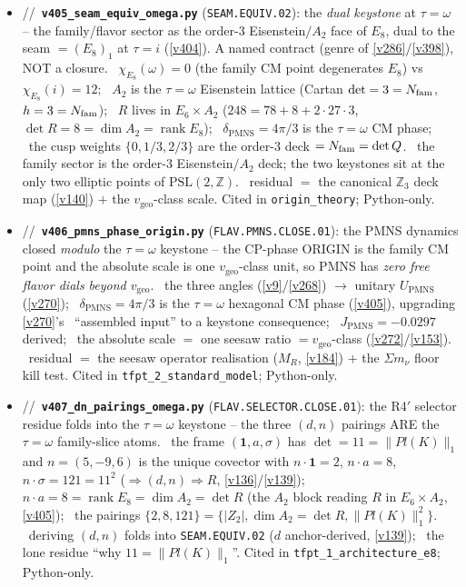\begin{itemize}
\item \mE/\mC/\mO\ \textbf{\texttt{v405\_seam\_equiv\_omega.py}} (\texttt{SEAM.EQUIV.02}): the \emph{dual keystone} at $\tau{=}\omega$ -- the family/flavor sector as the order-$3$ Eisenstein$/A_2$ face of $E_8$, dual to the seam $=(E_8)_1$ at $\tau{=}i$ (\vref{v404}). A named contract (genre of \vref{v286}/\vref{v398}), NOT a closure. \mE\ $\chi_{E_8}(\omega)=0$ (the family CM point degenerates $E_8$) vs $\chi_{E_8}(i)=12$; \mE\ $A_2$ is the $\tau{=}\omega$ Eisenstein lattice (Cartan $\det=3=N_{\mathrm{fam}}$, $h=3=N_{\mathrm{fam}}$); \mE\ $R$ lives in $E_6{\times}A_2$ ($248=78+8+2{\cdot}27{\cdot}3$, $\det R=8=\dim A_2=\operatorname{rank}E_8$); \mE\ $\delta_{\mathrm{PMNS}}=4\pi/3$ is the $\tau{=}\omega$ CM phase; \mE\ the cusp weights $\{0,1/3,2/3\}$ are the order-$3$ deck $=N_{\mathrm{fam}}=\det Q$. \mC\ the family sector is the order-$3$ Eisenstein$/A_2$ deck; the two keystones sit at the only two elliptic points of $\mathrm{PSL}(2,\mathbb Z)$. \mO\ residual $=$ the canonical $\mathbb Z_3$ deck map (\vref{v140}) $+$ the $v_{\mathrm{geo}}$-class scale. Cited in \texttt{origin\_theory}; Python-only.
\item \mE/\mC/\mO\ \textbf{\texttt{v406\_pmns\_phase\_origin.py}} (\texttt{FLAV.PMNS.CLOSE.01}): the PMNS dynamics closed \emph{modulo} the $\tau{=}\omega$ keystone -- the CP-phase ORIGIN is the family CM point and the absolute scale is one $v_{\mathrm{geo}}$-class unit, so PMNS has \emph{zero free flavor dials beyond $v_{\mathrm{geo}}$}. \mE\ the three angles (\vref{v9}/\vref{v268}) $\to$ unitary $U_{\mathrm{PMNS}}$ (\vref{v270}); \mC\ $\delta_{\mathrm{PMNS}}=4\pi/3$ is the $\tau{=}\omega$ hexagonal CM phase (\vref{v405}), upgrading \vref{v270}'s \mO\ ``assembled input'' to a keystone consequence; \mC\ $J_{\mathrm{PMNS}}=-0.0297$ derived; \mE\ the absolute scale $=$ one seesaw ratio $=v_{\mathrm{geo}}$-class (\vref{v272}/\vref{v153}). \mO\ residual $=$ the seesaw operator realisation ($M_R$, \vref{v184}) $+$ the $\Sigma m_\nu$ floor kill test. Cited in \texttt{tfpt\_2\_standard\_model}; Python-only.
\item \mE/\mC/\mO\ \textbf{\texttt{v407\_dn\_pairings\_omega.py}} (\texttt{FLAV.SELECTOR.CLOSE.01}): the R4$'$ selector residue folds into the $\tau{=}\omega$ keystone -- the three $(d,n)$ pairings ARE the $\tau{=}\omega$ family-slice atoms. \mE\ the frame $(\mathbf 1,a,\sigma)$ has $\det=11=\|Pl(K)\|_1$ and $n=(5,-9,6)$ is the unique covector with $n{\cdot}\mathbf1=2$, $n{\cdot}a=8$, $n{\cdot}\sigma=121=11^2$ ($\Rightarrow(d,n)\Rightarrow R$, \vref{v136}/\vref{v139}); \mE\ $n{\cdot}a=8=\operatorname{rank}E_8=\dim A_2=\det R$ (the $A_2$ block reading $R$ in $E_6{\times}A_2$, \vref{v405}); \mE\ the pairings $\{2,8,121\}=\{|Z_2|,\dim A_2{=}\det R,\|Pl(K)\|_1^2\}$. \mC\ deriving $(d,n)$ folds into \texttt{SEAM.EQUIV.02} ($d$ anchor-derived, \vref{v139}); \mO\ the lone residue ``why $11{=}\|Pl(K)\|_1$''. Cited in \texttt{tfpt\_1\_architecture\_e8}; Python-only.
\end{itemize}

